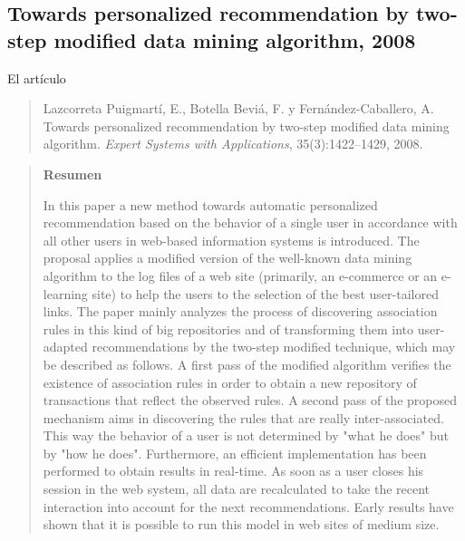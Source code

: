 \subsection*{Towards personalized recommendation by two-step modified \apriori data mining algorithm, 2008}
\label{sec:nuestro-Torwards-2008}

El artículo
\begin{quote}%
  Lazcorreta Puigmartí, E., Botella Beviá, F. y Fernández-Caballero, A. Towards personalized recommendation by two-step modified \apriori data mining algorithm. {\em Expert Systems with Applications}, 35(3):1422--1429, 2008.   
\end{quote}

	\begin{quotation}
	\noindent\textbf{Resumen}

	\nopagebreak In this paper a new method towards automatic personalized recommendation based on the behavior of a single user in accordance with all other users in web-based information systems is introduced. The proposal applies a modified version of the well-known \apriori data mining algorithm to the log files of a web site (primarily, an e-commerce or an e-learning site) to help the users to the selection of the best user-tailored links. The paper mainly analyzes the process of discovering association rules in this kind of big repositories and of transforming them into user-adapted recommendations by the two-step modified \apriori technique, which may be described as follows. A first pass of the modified \apriori algorithm verifies the existence of association rules in order to obtain a new repository of transactions that reflect the observed rules. A second pass of the proposed \apriori mechanism aims in discovering the rules that are really inter-associated. This way the behavior of a user is not determined by "what he does" but by "how he does". Furthermore, an efficient implementation has been performed to obtain results in real-time. As soon as a user closes his session in the web system, all data are recalculated to take the recent interaction into account for the next recommendations. Early results have shown that it is possible to run this model in web sites of medium size.
	\end{quotation}

